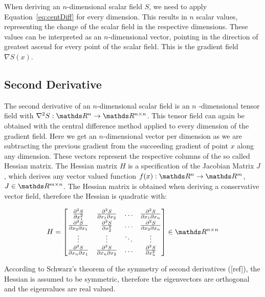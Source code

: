 When deriving an $n$-dimensional scalar field $S$, we need to apply
Equation~\ref{eq:centDiff} for every dimension. This results in $n$
scalar values, representing the change of the scalar field in the
respective dimensions. These values can be interpreted as an
$n$-dimensional vector, pointing in the direction of greatest ascend for
every point of the scalar field. This is the gradient field $\nabla
S(x)$.

\subsection{Second Derivative}

The second derivative of an $n$-dimensional scalar field is an $n$
-dimensional tensor field with $\nabla^2 S:\real^n \rightarrow \real^{n \times n}$.
This tensor field can again be obtained with the central difference
method applied to every dimension of the gradient field. Here we get an
$n$-dimensional vector per dimension as we are subtracting the previous
gradient from the succeeding gradient of point $x$ along any dimension.
These vectors represent the respective columns of the so called Hessian
matrix. The Hessian matrix $H$ is a specification of the Jacobian Matrix $J$,
which derives any vector valued function $f(x): \real^n \rightarrow \real^m$,
$J \in \real^{m \times n}$. The Hessian matrix is obtained when deriving
a conservative vector field, therefore the Hessian is quadratic with:

\begin{equation}
  H =
  \begin{bmatrix}
    \frac{\partial^2 S}{\partial x_1^2} & \frac{\partial^2 S}{\partial x_1 \partial x_2} & \dots & \frac{\partial^2 S}{\partial x_1 \partial x_n}\\
    \frac{\partial^2 S}{\partial x_2 \partial x_1} & \frac{\partial^2 S}{\partial x_2^2} & \dots & \frac{\partial^2 S}{\partial x_2 \partial x_n}\\
    \vdots & \vdots & \ddots & \vdots \\
    \frac{\partial^2 S}{\partial x_n \partial x_1} & \frac{\partial^2 S}{\partial x_n \partial x_2} & \dots & \frac{\partial^2 S}{\partial x_n^2}
  \end{bmatrix}
  \in \real^{n \times n}
\end{equation}

\noindent According to Schwarz's theorem of the symmetry of second
derivatives ([ref]), the Hessian is assumed to be symmetric, therefore
the eigenvectors are orthogonal and the eigenvalues are real valued.

